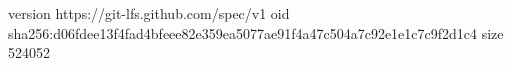version https://git-lfs.github.com/spec/v1
oid sha256:d06fdee13f4fad4bfeee82e359ea5077ae91f4a47c504a7c92e1e1c7c9f2d1c4
size 524052
